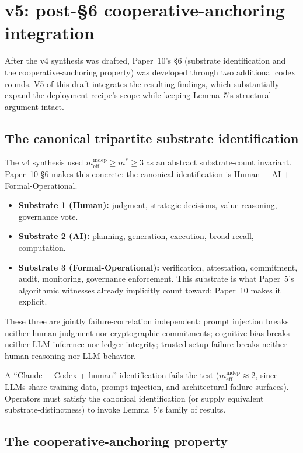 \documentclass{article}
\newcommand{\meff}{m_{\mathrm{eff}}}
\begin{document}
\section{v5: post-\S6 cooperative-anchoring integration}

After the v4 synthesis was drafted, Paper~10's \S6 (substrate
identification and the cooperative-anchoring property) was developed
through two additional codex rounds.  V5 of this draft integrates
the resulting findings, which substantially expand the deployment
recipe's scope while keeping Lemma~5's structural argument intact.

\subsection{The canonical tripartite substrate identification}

The v4 synthesis used $\meff^{\mathrm{indep}} \geq m^* \geq 3$ as
an abstract substrate-count invariant.  Paper~10 \S6 makes this
concrete: the canonical identification is Human + AI +
Formal-Operational.

\begin{itemize}
\item \textbf{Substrate 1 (Human):} judgment, strategic decisions,
  value reasoning, governance vote.
\item \textbf{Substrate 2 (AI):} planning, generation, execution,
  broad-recall, computation.
\item \textbf{Substrate 3 (Formal-Operational):} verification,
  attestation, commitment, audit, monitoring, governance enforcement.
  This substrate is what Paper~5's algorithmic witnesses already
  implicitly count toward; Paper~10 makes it explicit.
\end{itemize}

These three are jointly failure-correlation independent: prompt
injection breaks neither human judgment nor cryptographic
commitments; cognitive bias breaks neither LLM inference nor ledger
integrity; trusted-setup failure breaks neither human reasoning nor
LLM behavior.

A ``Claude + Codex + human'' identification fails the test ($\meff^
{\mathrm{indep}} \approx 2$, since LLMs share training-data,
prompt-injection, and architectural failure surfaces).  Operators
must satisfy the canonical identification (or supply equivalent
substrate-distinctness) to invoke Lemma~5's family of results.

\subsection{The cooperative-anchoring property}
\end{document}
